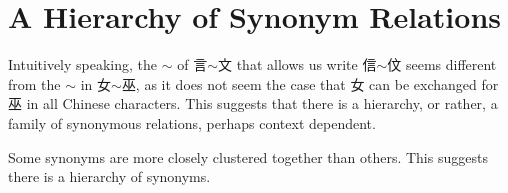 \section{A Hierarchy of Synonym Relations}

Intuitively speaking, the $\sim$ of 言$\sim$文 that allows us write 信$\sim$伩 seems different from the $\sim$ in 女$\sim$巫, as it does not seem the case that 女 can be exchanged for 巫 in all Chinese characters. This suggests that there is a hierarchy, or rather, a family of synonymous relations, perhaps context dependent. 

Some synonyms are more closely clustered together than others. This suggests there is a hierarchy of synonyms.
